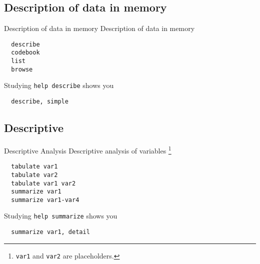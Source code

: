 \subsection{Description of data in memory}
\begin{frame}[fragile]{Description of data in memory}
Description of data in memory      

  \begin{lstlisting}
  describe
  codebook
  list
  browse
  \end{lstlisting}
  
Studying \texttt{help describe} shows you
  \begin{lstlisting}
  describe, simple
  \end{lstlisting}
  

\end{frame}

\subsection{Descriptive}
\begin{frame}[fragile]{Descriptive Analysis}
Descriptive analysis of variables \footnote{\texttt{var1} and \texttt{var2} are placeholders.}

  
  \begin{lstlisting}
  tabulate var1
  tabulate var2
  tabulate var1 var2
  summarize var1
  summarize var1-var4
  \end{lstlisting}

Studying \texttt{help summarize} shows you
  \begin{lstlisting}
  summarize var1, detail
  \end{lstlisting}

\end{frame}